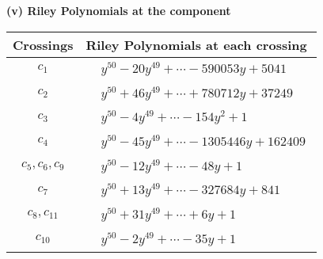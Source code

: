 \documentclass[1p]{elsarticle_modified}
\theoremstyle{definition}
\begin{document}
\newpage\renewcommand{\arraystretch}{1}
\flushleft \textbf{(v) Riley Polynomials at the component}\newline \\
\begin{tabular}{m{50pt}|m{274pt}}
Crossings & \hspace{64pt}Riley Polynomials at each crossing \\
\hline $$\begin{aligned}c_{1}\end{aligned}$$&$\begin{aligned}
&y^{50}-20 y^{49}+\cdots-590053 y+5041
\end{aligned}$\\
\hline $$\begin{aligned}c_{2}\end{aligned}$$&$\begin{aligned}
&y^{50}+46 y^{49}+\cdots+780712 y+37249
\end{aligned}$\\
\hline $$\begin{aligned}c_{3}\end{aligned}$$&$\begin{aligned}
&y^{50}-4 y^{49}+\cdots-154 y^2+1
\end{aligned}$\\
\hline $$\begin{aligned}c_{4}\end{aligned}$$&$\begin{aligned}
&y^{50}-45 y^{49}+\cdots-1305446 y+162409
\end{aligned}$\\
\hline $$\begin{aligned}c_{5},c_{6},c_{9}\end{aligned}$$&$\begin{aligned}
&y^{50}-12 y^{49}+\cdots-48 y+1
\end{aligned}$\\
\hline $$\begin{aligned}c_{7}\end{aligned}$$&$\begin{aligned}
&y^{50}+13 y^{49}+\cdots-327684 y+841
\end{aligned}$\\
\hline $$\begin{aligned}c_{8},c_{11}\end{aligned}$$&$\begin{aligned}
&y^{50}+31 y^{49}+\cdots+6 y+1
\end{aligned}$\\
\hline $$\begin{aligned}c_{10}\end{aligned}$$&$\begin{aligned}
&y^{50}-2 y^{49}+\cdots-35 y+1
\end{aligned}$\\
\hline
\end{tabular}\\~\\
\end{document}
